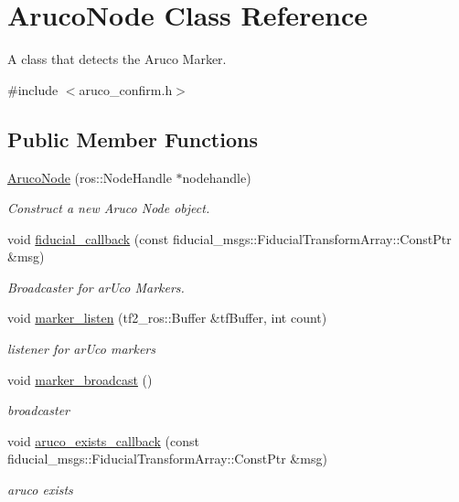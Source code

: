 \hypertarget{class_aruco_node}{}\section{Aruco\+Node Class Reference}
\label{class_aruco_node}


A class that detects the Aruco Marker.  




{\ttfamily \#include $<$aruco\+\_\+confirm.\+h$>$}

\subsection*{Public Member Functions}
\begin{DoxyCompactItemize}
\item 
\hyperlink{class_aruco_node_ad539e5027a1d41e9e62f354db9ec40aa}{Aruco\+Node} (ros\+::\+Node\+Handle $\ast$nodehandle)
\begin{DoxyCompactList}\small\item\em Construct a new Aruco Node object. \end{DoxyCompactList}\item 
void \hyperlink{class_aruco_node_af68c583d73a36c483d28b96a6fd22713}{fiducial\+\_\+callback} (const fiducial\+\_\+msgs\+::\+Fiducial\+Transform\+Array\+::\+Const\+Ptr \&msg)
\begin{DoxyCompactList}\small\item\em Broadcaster for ar\+Uco Markers. \end{DoxyCompactList}\item 
void \hyperlink{class_aruco_node_ad79fd951057c9a40f34fc159363fbd94}{marker\+\_\+listen} (tf2\+\_\+ros\+::\+Buffer \&tf\+Buffer, int count)
\begin{DoxyCompactList}\small\item\em listener for ar\+Uco markers \end{DoxyCompactList}\item 
void \hyperlink{class_aruco_node_adb4d7fb3af40cb83ae69be077c589558}{marker\+\_\+broadcast} ()
\begin{DoxyCompactList}\small\item\em broadcaster \end{DoxyCompactList}\item 
void \hyperlink{class_aruco_node_a38f5977cae0f0cc0d30449db22b2e9d6}{aruco\+\_\+exists\+\_\+callback} (const fiducial\+\_\+msgs\+::\+Fiducial\+Transform\+Array\+::\+Const\+Ptr \&msg)
\begin{DoxyCompactList}\small\item\em aruco exists \end{DoxyCompactList}\item 

\end{DoxyCompactItemize}
